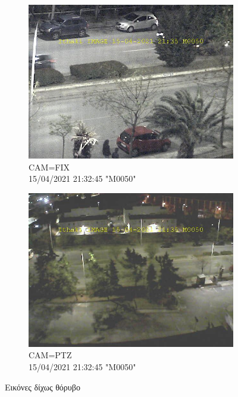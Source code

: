 \documentclass[hidelinks, 12pt, a4paper]{article}
\begin{document}
\begin{figure}[h!]
     \begin{subfigure}[b]{0.5\textwidth}
         \centering
         \includegraphics[keepaspectratio, width=\textwidth]{image_error_free_fix.jpg}
         \caption{CAM=FIX \\ 15/04/2021 21:32:45 "M0050"}
     \end{subfigure}
     \begin{subfigure}[b]{0.5\textwidth}
         \centering
         \includegraphics[keepaspectratio, width=\textwidth]{image_error_free_ptz.jpg}
         \caption{CAM=PTZ \\ 15/04/2021 21:32:45 "M0050"}
     \end{subfigure}
     \caption{Εικόνες δίχως θόρυβο}
\end{figure}
\end{document}
